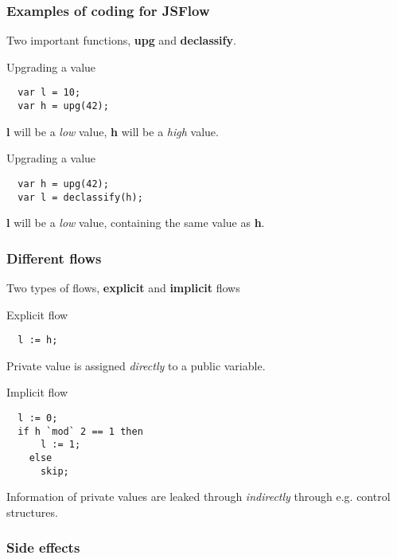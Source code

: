 \documentclass{beamer}
\begin{document}

\begin{frame}[fragile]
  \frametitle{Examples of coding for JSFlow}
  Two important functions, \textbf{upg} and \textbf{declassify}.
  \pause
  \begin{block}{Upgrading a value}
\begin{verbatim}
  var l = 10;
  var h = upg(42);
\end{verbatim}
  \end{block}
  \textbf{l} will be a \emph{low} value, \textbf{h} will be a \emph{high} value.
  \pause
  \begin{block}{Upgrading a value}
\begin{verbatim}
  var h = upg(42);
  var l = declassify(h);
\end{verbatim}
  \end{block}
  \textbf{l} will be a \emph{low} value, containing the same value as \textbf{h}.
\end{frame}


\begin{frame}[fragile]
  \frametitle{Different flows}
  Two types of flows, \textbf{explicit} and \textbf{implicit} flows \pause
  \newline
  \begin{block}{Explicit flow}
\begin{verbatim}
  l := h;
\end{verbatim}
  \end{block}
  Private value is assigned \emph{directly} to a public variable.
  \pause
  \begin{block}{Implicit flow}
\begin{verbatim}
  l := 0;
  if h `mod` 2 == 1 then
      l := 1;
    else
      skip;
\end{verbatim}
  \end{block}
  Information of private values are leaked through \emph{indirectly} through e.g. control structures.
\end{frame}


\begin{frame}
  \frametitle{Side effects}
  
\end{frame}
\end{document}
